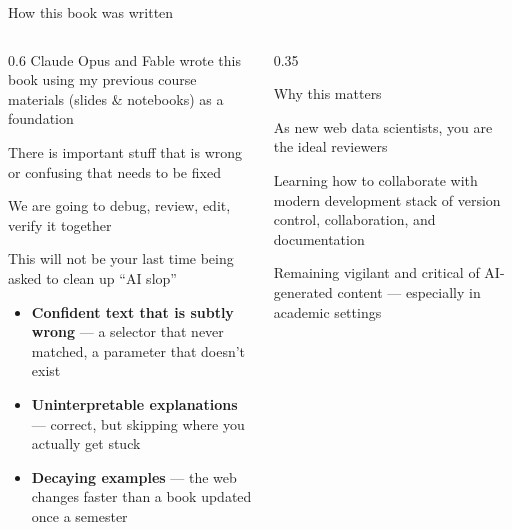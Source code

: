 \documentclass[9pt,aspectratio=169]{beamer}
\begin{document}
\begin{frame}{How this book was written}
    \begin{columns}[T]
        \begin{column}{0.6\textwidth}
            Claude Opus and Fable wrote this book using my previous course materials (slides \& notebooks) as a foundation

            \medskip
            There is important stuff that is wrong or confusing that needs to be fixed
            
            \medskip
            We are going to debug, review, edit, verify it together
            
            \bigskip
            This will not be your last time being asked to clean up ``AI slop''
            \begin{itemize}\small
                \item \textbf{Confident text that is subtly wrong} --- a selector that never matched, a parameter that doesn't exist
                \item \textbf{Uninterpretable explanations} --- correct, but skipping where you actually get stuck
                \item \textbf{Decaying examples} --- the web changes faster than a book updated once a semester
            \end{itemize}
        \end{column}
        \begin{column}{0.35\textwidth}
            \begin{alertblock}{Why this matters}
                \footnotesize 
                
                As new web data scientists, you are the ideal reviewers
                
                \smallskip
                Learning how to collaborate with modern development stack of version control, collaboration, and documentation

                \smallskip
                Remaining vigilant and critical of AI-generated content --- especially in academic settings
                
            \end{alertblock}
        \end{column}
    \end{columns}
\end{frame}
\end{document}
